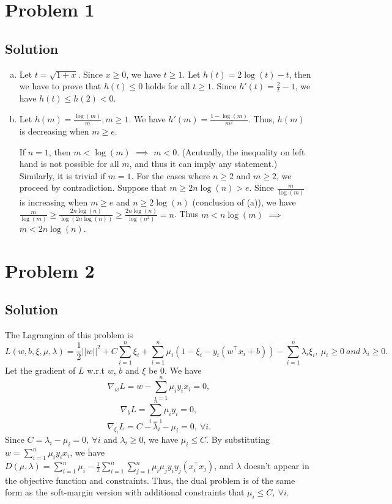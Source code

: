 \documentclass[11pt]{report}
\newcommand{\T}{\intercal}
\begin{document}

\section*{Problem 1}
\subsection*{Solution}
\begin{enumerate}[(a)]
\item Let $t = \sqrt{1+x}$. Since $x \geq 0$, we have $t \geq 1$. Let $h(t) = 2\log(t) - t$, then we have to prove that $h(t) \leq 0$ holds for all $t \geq 1$. Since $h'(t) = \frac{2}{t}-1$, we have $h(t) \leq h(2) < 0$.
\item Let $h(m) = \frac{\log(m)}{m}, m \geq 1$. We have $h'(m) = \frac{1-\log(m)}{m^2}$. Thus, $h(m)$ is decreasing when $m \geq e$.

If $n=1$, then $m < \log(m)$ $\implies$ $m<0$. (Acutually, the inequality on left hand is not possible for all $m$, and thus it can imply any statement.) Similarly, it is trivial if $m=1$. For the cases where $n \geq 2$ and $m \geq 2$, we proceed by contradiction. Suppose that $m \geq 2n\log(n) > e$. Since $\frac{m}{\log(m)}$ is increasing when $m \geq e$ and $n \geq 2\log(n)$ (conclusion of (a)), we have $\frac{m}{\log(m)} \geq \frac{2n\log(n)}{\log(2n\log(n))} \geq \frac{2n\log(n)}{\log(n^2)} = n$. Thus $m < n\log(m)$ $\implies$ $m < 2n\log(n)$.
\end{enumerate}
\section*{Problem 2}
\subsection*{Solution}
The Lagrangian of this problem is $$L(w, b, \xi, \mu, \lambda) = \frac{1}{2} ||w||^2 + C\sum_{i=1}^{n} \xi_i + \sum_{i=1}^{n} \mu_i(1-\xi_i-y_i(w^\T x_i+b)) - \sum_{i=1}^{n} \lambda_i \xi_i,~\mu_i \geq 0~and~\lambda_i \geq 0.$$
Let the gradient of $L$ w.r.t $w$, $b$ and $\xi$ be $0$. We have
$$\nabla_w L = w - \sum_{i=1}^{n} \mu_i y_i x_i = 0,$$
$$\nabla_b L = \sum_{i=1}^{n} \mu_i y_i = 0,$$
$$\nabla_{\xi_i} L = C - \lambda_i - \mu_i = 0,~\forall i.$$
Since $C = \lambda_i - \mu_i = 0,~\forall i$ and $\lambda_i \geq 0$, we have $\mu_i \leq C$.
By substituting $w = \sum_{i=1}^{n} \mu_i y_i x_i$, we have $D(\mu, \lambda) = \sum_{i=1}^{n} \mu_i - \frac{1}{2}\sum_{i=1}^{n}\sum_{j=1}^{n}\mu_i\mu_jy_iy_j(x_i^\T x_j)$, and $\lambda$ doesn't appear in the objective function and constraints. Thus, the dual problem is of the same form as the soft-margin version with additional constraints that $\mu_i \leq C,~\forall i$.
\end{document}
